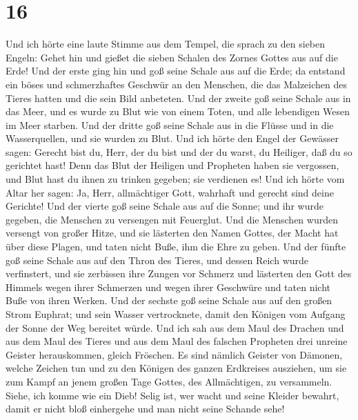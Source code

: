 \hypertarget{section-15}{%
\section{16}\label{section-15}}

 Und ich hörte eine laute Stimme aus dem Tempel, die
sprach zu den sieben Engeln: Gehet hin und gießet die sieben Schalen des
Zornes Gottes aus auf die Erde!  Und der erste ging hin
und goß seine Schale aus auf die Erde; da entstand ein böses und
schmerzhaftes Geschwür an den Menschen, die das Malzeichen des Tieres
hatten und die sein Bild anbeteten.  Und der zweite goß
seine Schale aus in das Meer, und es wurde zu Blut wie von einem Toten,
und alle lebendigen Wesen im Meer starben.  Und der dritte
goß seine Schale aus in die Flüsse und in die Wasserquellen, und sie
wurden zu Blut.  Und ich hörte den Engel der Gewässer
sagen: Gerecht bist du, Herr, der du bist und der du warst, du Heiliger,
daß du so gerichtet hast!  Denn das Blut der Heiligen und
Propheten haben sie vergossen, und Blut hast du ihnen zu trinken
gegeben; sie verdienen es!  Und ich hörte vom Altar her
sagen: Ja, Herr, allmächtiger Gott, wahrhaft und gerecht sind deine
Gerichte!  Und der vierte goß seine Schale aus auf die
Sonne; und ihr wurde gegeben, die Menschen zu versengen mit Feuerglut.
 Und die Menschen wurden versengt von großer Hitze, und
sie lästerten den Namen Gottes, der Macht hat über diese Plagen, und
taten nicht Buße, ihm die Ehre zu geben.  Und der fünfte
goß seine Schale aus auf den Thron des Tieres, und dessen Reich wurde
verfinstert, und sie zerbissen ihre Zungen vor Schmerz 
und lästerten den Gott des Himmels wegen ihrer Schmerzen und wegen ihrer
Geschwüre und taten nicht Buße von ihren Werken.  Und der
sechste goß seine Schale aus auf den großen Strom Euphrat; und sein
Wasser vertrocknete, damit den Königen vom Aufgang der Sonne der Weg
bereitet würde.  Und ich sah aus dem Maul des Drachen und
aus dem Maul des Tieres und aus dem Maul des falschen Propheten drei
unreine Geister herauskommen, gleich Fröschen.  Es sind
nämlich Geister von Dämonen, welche Zeichen tun und zu den Königen des
ganzen Erdkreises ausziehen, um sie zum Kampf an jenem großen Tage
Gottes, des Allmächtigen, zu versammeln.  Siehe, ich
komme wie ein Dieb! Selig ist, wer wacht und seine Kleider bewahrt,
damit er nicht bloß einhergehe und man nicht seine Schande sehe!
